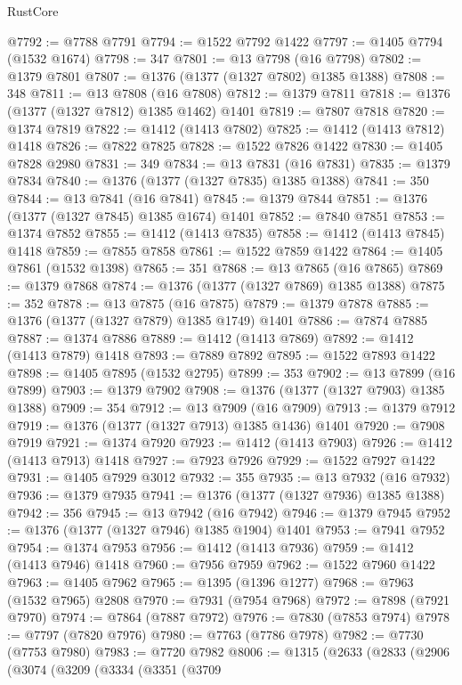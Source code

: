 \begin{lexlean}{RustCore}
\begin{coremodule}
@7792 := @7788 @7791
@7794 := @1522 @7792 @1422
@7797 := @1405 @7794 (@1532 @1674)
@7798 := 347
@7801 := @13 @7798 (@16 @7798)
@7802 := @1379 @7801
@7807 := @1376 (@1377 (@1327 @7802) @1385 @1388)
@7808 := 348
@7811 := @13 @7808 (@16 @7808)
@7812 := @1379 @7811
@7818 := @1376 (@1377 (@1327 @7812) @1385 @1462) @1401
@7819 := @7807 @7818
@7820 := @1374 @7819
@7822 := @1412 (@1413 @7802)
@7825 := @1412 (@1413 @7812) @1418
@7826 := @7822 @7825
@7828 := @1522 @7826 @1422
@7830 := @1405 @7828 @2980
@7831 := 349
@7834 := @13 @7831 (@16 @7831)
@7835 := @1379 @7834
@7840 := @1376 (@1377 (@1327 @7835) @1385 @1388)
@7841 := 350
@7844 := @13 @7841 (@16 @7841)
@7845 := @1379 @7844
@7851 := @1376 (@1377 (@1327 @7845) @1385 @1674) @1401
@7852 := @7840 @7851
@7853 := @1374 @7852
@7855 := @1412 (@1413 @7835)
@7858 := @1412 (@1413 @7845) @1418
@7859 := @7855 @7858
@7861 := @1522 @7859 @1422
@7864 := @1405 @7861 (@1532 @1398)
@7865 := 351
@7868 := @13 @7865 (@16 @7865)
@7869 := @1379 @7868
@7874 := @1376 (@1377 (@1327 @7869) @1385 @1388)
@7875 := 352
@7878 := @13 @7875 (@16 @7875)
@7879 := @1379 @7878
@7885 := @1376 (@1377 (@1327 @7879) @1385 @1749) @1401
@7886 := @7874 @7885
@7887 := @1374 @7886
@7889 := @1412 (@1413 @7869)
@7892 := @1412 (@1413 @7879) @1418
@7893 := @7889 @7892
@7895 := @1522 @7893 @1422
@7898 := @1405 @7895 (@1532 @2795)
@7899 := 353
@7902 := @13 @7899 (@16 @7899)
@7903 := @1379 @7902
@7908 := @1376 (@1377 (@1327 @7903) @1385 @1388)
@7909 := 354
@7912 := @13 @7909 (@16 @7909)
@7913 := @1379 @7912
@7919 := @1376 (@1377 (@1327 @7913) @1385 @1436) @1401
@7920 := @7908 @7919
@7921 := @1374 @7920
@7923 := @1412 (@1413 @7903)
@7926 := @1412 (@1413 @7913) @1418
@7927 := @7923 @7926
@7929 := @1522 @7927 @1422
@7931 := @1405 @7929 @3012
@7932 := 355
@7935 := @13 @7932 (@16 @7932)
@7936 := @1379 @7935
@7941 := @1376 (@1377 (@1327 @7936) @1385 @1388)
@7942 := 356
@7945 := @13 @7942 (@16 @7942)
@7946 := @1379 @7945
@7952 := @1376 (@1377 (@1327 @7946) @1385 @1904) @1401
@7953 := @7941 @7952
@7954 := @1374 @7953
@7956 := @1412 (@1413 @7936)
@7959 := @1412 (@1413 @7946) @1418
@7960 := @7956 @7959
@7962 := @1522 @7960 @1422
@7963 := @1405 @7962
@7965 := @1395 (@1396 @1277)
@7968 := @7963 (@1532 @7965) @2808
@7970 := @7931 (@7954 @7968)
@7972 := @7898 (@7921 @7970)
@7974 := @7864 (@7887 @7972)
@7976 := @7830 (@7853 @7974)
@7978 := @7797 (@7820 @7976)
@7980 := @7763 (@7786 @7978)
@7982 := @7730 (@7753 @7980)
@7983 := @7720 @7982
@8006 := @1315
    (@2633
      (@2833
        (@2906
          (@3074
            (@3209
              (@3334
                (@3351
                  (@3709

\end{coremodule}
\end{lexlean}
